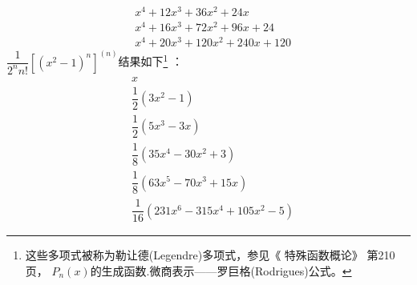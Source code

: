 \begin{enumerate}[label={【\textbf{例\thechapter.\arabic*}】},
 leftmargin=\inteval{\myenumleftmargin}pt,
 itemsep=\inteval{\myenumitempsep}pt,
 itemindent=\inteval{\myenumitemindent}pt]
\begin{align*}
    & x^4+12x^3+36x^2+24x       \\
    & x^4+16x^3+72x^2+96x+24    \\
    & x^4+20x^3+120x^2+240x+120 
\end{align*}
$ \dfrac{1}{2^n n!}\left[(x^2-1)^n\right]^{(n)} $结果如下\footnote{
    这些多项式被称为勒让德(Legendre)多项式，参见《 特殊函数概论》 第210页，
    $ P_n(x) $的生成函数.微商表示——罗巨格(Rodrigues)公式。} ：
\begin{align*}
    & x                                    \\
    & \dfrac{1}{2}(3x^2-1)                  \\
    & \dfrac{1}{2}(5x^3-3x)                 \\
    & \dfrac{1}{8}(35x^4-30x^2+3)           \\
    & \dfrac{1}{8}(63x^5-70x^3+15x)         \\
    & \dfrac{1}{16}(231x^6-315x^4+105x^2-5) 
\end{align*} 


\end{enumerate}
